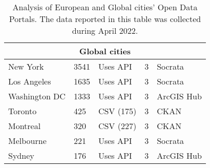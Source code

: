 \begin{table}[!ht]
\begin{tabular}{|lllll|}
    \multicolumn{5}{|c|}{\textbf{Global cities}}      \\ \hline
    \multicolumn{1}{|l|}{New York}                    & \multicolumn{1}{|l|}{3541}                                             & \multicolumn{1}{|l|}{Uses \acs{API}}                                                  & \multicolumn{1}{|l|}{3}        & \multicolumn{1}{|l|}{Socrata}                                   \\ \hline
    \multicolumn{1}{|l|}{Los Angeles}                 & \multicolumn{1}{|l|}{1635}                                             & \multicolumn{1}{|l|}{Uses \acs{API}}                                                  & \multicolumn{1}{|l|}{3}        & \multicolumn{1}{|l|}{Socrata}                                   \\ \hline
    \multicolumn{1}{|l|}{Washington DC}               & \multicolumn{1}{|l|}{1333}                                             & \multicolumn{1}{|l|}{Uses \acs{API}}                                                  & \multicolumn{1}{|l|}{3}        & \multicolumn{1}{|l|}{ArcGIS Hub}                                   \\ \hline
    \multicolumn{1}{|l|}{Toronto}                     & \multicolumn{1}{|l|}{425}                                              & \multicolumn{1}{|l|}{CSV (175)}                                                       & \multicolumn{1}{|l|}{3}        & \multicolumn{1}{|l|}{CKAN}                                   \\ \hline
    \multicolumn{1}{|l|}{Montreal}                    & \multicolumn{1}{|l|}{320}                                              & \multicolumn{1}{|l|}{CSV (227)}                                                       & \multicolumn{1}{|l|}{3}        & \multicolumn{1}{|l|}{CKAN}                                   \\ \hline
    \multicolumn{1}{|l|}{Melbourne}                   & \multicolumn{1}{|l|}{221}                                              & \multicolumn{1}{|l|}{Uses \acs{API}}                                                  & \multicolumn{1}{|l|}{3}        & \multicolumn{1}{|l|}{Socrata}                                   \\ \hline
    \multicolumn{1}{|l|}{Sydney}                      & \multicolumn{1}{|l|}{176}                                              & \multicolumn{1}{|l|}{Uses \acs{API}}                                                  & \multicolumn{1}{|l|}{3}        & \multicolumn{1}{|l|}{ArcGIS Hub}                                   \\ \hline
  \end{tabular}
  \caption{Analysis of European and Global cities' Open Data Portals. The data reported in this table was collected during April 2022.}
  \label{tab:other-cities}
\end{table}